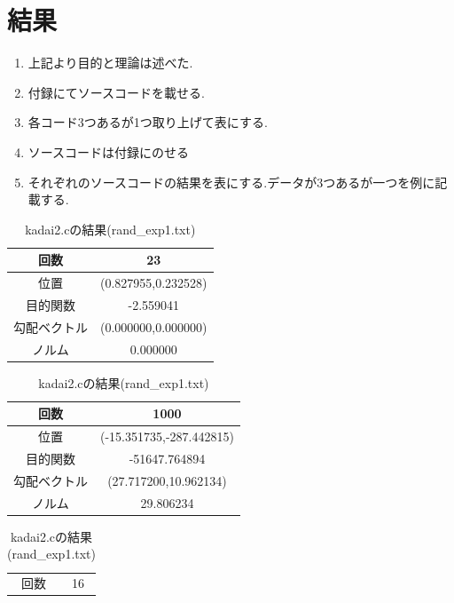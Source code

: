 \documentclass[12pt]{jarticle}
\begin{document}
\section{結果}
\begin{enumerate}
    \item 上記より目的と理論は述べた.
    \item 付録にてソースコードを載せる.
    \item 各コード3つあるが1つ取り上げて表にする.\\
    \item ソースコードは付録にのせる
    \item それぞれのソースコードの結果を表にする.データが3つあるが一つを例に記載する.
\end{enumerate}
\begin{table}[h]
    \caption{kadai1.c}
    \begin{center}
        \begin{tabular}{|c|c|}
            \hline
            回数         & 23                  \\
            \hline
            位置         & (0.827955,0.232528) \\
            \hline
            目的関数     & -2.559041           \\
            \hline
            勾配ベクトル & (0.000000,0.000000) \\
            \hline
            ノルム       & 0.000000            \\
            \hline
        \end{tabular}
        \caption{kadai1\_2.cの結果(data60.txt)}
        \begin{tabular}{|c|c|}
            \hline
            回数         & 1000                     \\
            \hline
            位置         & (-15.351735,-287.442815) \\
            \hline
            目的関数     & -51647.764894            \\
            \hline
            勾配ベクトル & (27.717200,10.962134)    \\
            \hline
            ノルム       & 29.806234                \\
            \hline
        \end{tabular}
        \caption{kadai2.cの結果(rand\_exp1.txt)}
        \begin{tabular}{|c|c|}
            \hline
            回数         & 16                   \\

\end{tabular}
\end{center}
\end{table}
\end{document}
